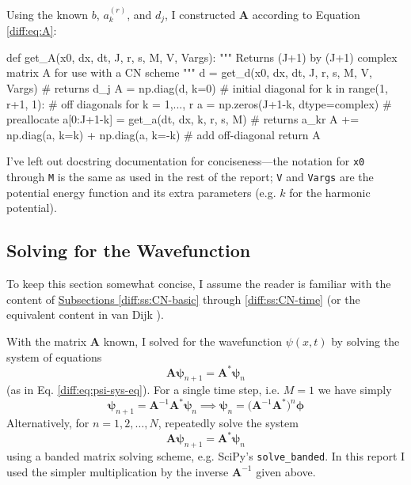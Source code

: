 \documentclass[11pt, a4paper]{article}
\newcommand{\mat}[1]{\mathbf{#1}}
\begin{document}
Using the known  $ b $, $ a_{k}^{(r)} $, and $ d_{j} $, I constructed $ \mat{A} $ according to Equation \ref{diff:eq:A}:
\begin{python}
def get_A(x0, dx, dt, J, r, s, M, V, Vargs):
    """ Returns (J+1) by (J+1) complex matrix A for use with a CN scheme """
    d = get_d(x0, dx, dt, J, r, s, M, V, Vargs)  # returns d_j
    A = np.diag(d, k=0)  # initial diagonal
    for k in range(1, r+1, 1):  # off diagonals for k = 1,..., r
        a = np.zeros(J+1-k, dtype=complex)  # preallocate
        a[0:J+1-k] = get_a(dt, dx, k, r, s, M)  # returns a_kr
        A += np.diag(a, k=k) + np.diag(a, k=-k)  # add off-diagonal
    return A
\end{python}
I've left out docstring documentation for conciseness---the notation for \texttt{x0} through \texttt{M} is the same as used in the rest of the report; \texttt{V} and \texttt{Vargs} are the potential energy function and its extra parameters (e.g. $ k $ for the harmonic potential).



\subsection{Solving for the Wavefunction}
To keep this section somewhat concise, I assume the reader is familiar with the content of \hyperref[diff:ss:CN-basic]{Subsections \ref{diff:ss:CN-basic}} through \ref{diff:ss:CN-time} (or the equivalent content in van Dijk \cite{vandijk}).

\vspace{1mm}
With the matrix $ \mat{A} $ known, I solved for the wavefunction $ \psi(x, t) $ by solving the system of equations
\begin{equation*}
	\mat{A}\bm{\psi}_{n+1} = \mat{A}^{*}\bm{\psi}_{n}
\end{equation*}
(as in Eq. \ref{diff:eq:psi-sys-eq}). For a single time step, i.e. $ M = 1 $ we have simply
\begin{equation*}
	\bm{\psi}_{n+1} = \mat{A}^{-1}\mat{A}^{*}\bm{\psi}_{n} \implies \bm{\psi}_{n} = \big(\mat{A}^{-1}\mat{A}^{*}\big)^{n} \bm{\phi}
\end{equation*}
Alternatively, for $ n = 1, 2, \ldots, N $, repeatedly solve the system
\begin{equation*}
 \mat{A}\bm{\psi}_{n+1} = \mat{A}^{*}\bm{\psi}_{n}
\end{equation*}
using a banded matrix solving scheme, e.g. SciPy's \texttt{solve\_banded}. In this report I used the simpler multiplication by the inverse $ \mat{A}^{-1} $ given above.
\end{document}
